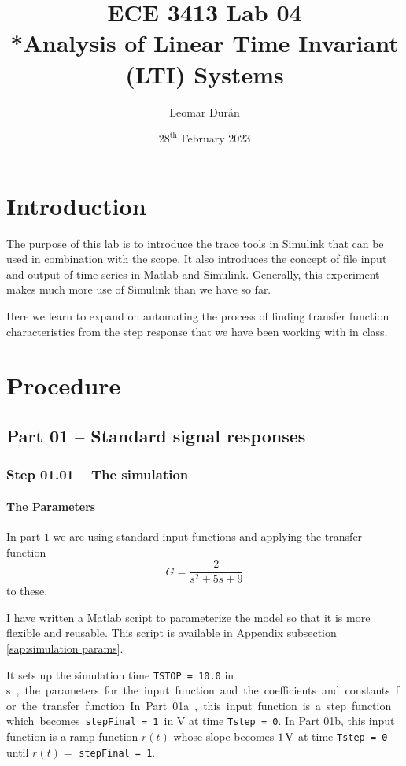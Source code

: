 \documentclass[12pt]{article}
\title{ECE 3413 Lab 04\\*Analysis of Linear Time Invariant (LTI) Systems}
\author{Leomar Dur\'an}
\date{${28}^{\text{th}}$ February 2023}
\begin{document}
\maketitle
\newpage

\section{Introduction}

The purpose of this lab is to introduce the trace tools in Simulink that can be used in combination with the scope.
It also introduces the concept of file input and output of time series in Matlab and Simulink.
Generally, this experiment makes much more use of Simulink than we have so far.

Here we learn to expand on automating the process of finding transfer function characteristics from the step response that we have been working with in class.

\section{Procedure}

\subsection{Part 01 -- Standard signal responses}

\subsubsection{Step 01.01 -- The simulation}

\paragraph{The Parameters}

In part $1$ we are using standard input functions and applying the transfer function
$$
    G = \frac2{s^2 + 5 s + 9}
$$
to these.

I have written a Matlab script to parameterize the model so that it is more flexible and reusable.
This script is available in Appendix subsection \ref{sap:simulation params}.

It sets up the simulation time \texttt{TSTOP = 10.0} in \si\second, the parameters for the input function and the coefficients and constants for the transfer function.
In Part 01a, this input function is a step function which becomes \texttt{stepFinal = 1} in $\si\volt$ at time \texttt{Tstep = 0}.
In Part 01b, this input function is a ramp function $r(t)$ whose slope becomes $\SI1\volt$ at time \texttt{Tstep = 0} until $r(t) =$ \texttt{stepFinal = 1}.
\end{document}
